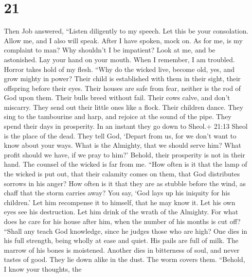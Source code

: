 \hypertarget{section-12}{%
\section{21}\label{section-12}}

 Then Job answered,  ``Listen diligently to my
speech. Let this be your consolation.  Allow me, and I also
will speak. After I have spoken, mock on.  As for me, is my
complaint to man? Why shouldn't I be impatient?  Look at me,
and be astonished. Lay your hand on your mouth.  When I
remember, I am troubled. Horror takes hold of my flesh. 
``Why do the wicked live, become old, yes, and grow mighty in power?
 Their child is established with them in their sight, their
offspring before their eyes.  Their houses are safe from
fear, neither is the rod of God upon them.  Their bulls
breed without fail. Their cows calve, and don't miscarry. 
They send out their little ones like a flock. Their children dance.
 They sing to the tambourine and harp, and rejoice at the
sound of the pipe.  They spend their days in prosperity. In
an instant they go down to Sheol.+ 21:13 Sheol is the place of the dead.
 They tell God, `Depart from us, for we don't want to know
about your ways.  What is the Almighty, that we should
serve him? What profit should we have, if we pray to him?' 
Behold, their prosperity is not in their hand. The counsel of the wicked
is far from me.  ``How often is it that the lamp of the
wicked is put out, that their calamity comes on them, that God
distributes sorrows in his anger?  How often is it that
they are as stubble before the wind, as chaff that the storm carries
away?  You say, `God lays up his iniquity for his
children.' Let him recompense it to himself, that he may know it.
 Let his own eyes see his destruction. Let him drink of the
wrath of the Almighty.  For what does he care for his house
after him, when the number of his months is cut off? 
``Shall any teach God knowledge, since he judges those who are high?
 One dies in his full strength, being wholly at ease and
quiet.  His pails are full of milk. The marrow of his bones
is moistened.  Another dies in bitterness of soul, and
never tastes of good.  They lie down alike in the dust. The
worm covers them.  ``Behold, I know your thoughts, the
